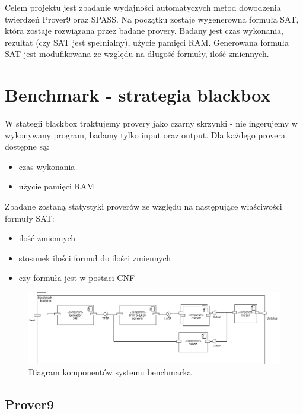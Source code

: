 \documentclass[a4paper,12pt]{article}
\begin{document}
Celem projektu jest zbadanie wydajności automatyczych metod dowodzenia twierdzeń Prover9 oraz SPASS. Na początku zostaje wygenerowna formuła \gls{SAT}, która zostaje rozwiązana przez badane provery. Badany jest czas wykonania, rezultat (czy SAT jest spełnialny), użycie pamięci RAM.
Generowana formuła SAT jest modufikowana ze względu na długość formuły, ilość zmiennych.

\section{Benchmark - strategia blackbox}

W stategii blackbox traktujemy provery jako czarny skrzynki - nie ingerujemy w wykonywany program, badamy tylko input oraz output. Dla każdego provera dostępne są:

\begin{itemize}
  \item czas wykonania
  \item użycie pamięci RAM
\end{itemize}

Zbadane zostaną statystyki proverów ze względu na następujące właściwości formuły SAT:

\begin{itemize}
  \item ilość zmiennych
  \item stosunek ilości formuł do ilości zmiennych
  \item czy formuła jest w postaci \gls{CNF}
\end{itemize}


\begin{figure}[!htb]
  \includegraphics[scale=0.4]{images/studio-projektowe1.png}
  \caption{Diagram komponentów systemu benchmarka}
\end{figure}

\newpage

\subsection{Prover9}
\end{document}
